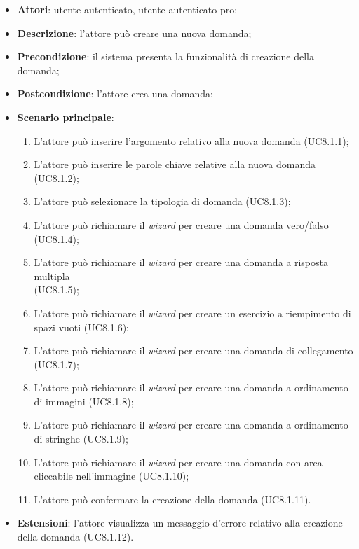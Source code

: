 	\begin{itemize}
		\item
			\textbf{Attori}: utente autenticato, utente autenticato pro;
		\item		
			\textbf{Descrizione}: l'attore può creare una nuova domanda;
		\item
			\textbf{Precondizione}: il sistema presenta la funzionalità di creazione della domanda;
		\item
			\textbf{Postcondizione}: l'attore crea una domanda;		
		\item
			\textbf{Scenario principale}:
	       		\begin{enumerate}
					\item
					L'attore può inserire l'argomento relativo alla nuova domanda (UC8.1.1);
					\item
					L'attore può inserire le parole chiave relative alla nuova domanda (UC8.1.2);
					\item
					L'attore può selezionare la tipologia di domanda (UC8.1.3);
					
					\item
					L'attore può richiamare il \textit{wizard} per creare una domanda vero/falso (UC8.1.4);
					\item
					L'attore può richiamare il \textit{wizard} per creare una domanda a risposta multipla \\(UC8.1.5);
					\item
					L'attore può richiamare il \textit{wizard} per creare un esercizio a riempimento di spazi vuoti (UC8.1.6);
					\item
					L'attore può richiamare il \textit{wizard} per creare una domanda di collegamento (UC8.1.7);
					\item
					L'attore può richiamare il \textit{wizard} per creare una domanda a ordinamento di immagini (UC8.1.8);
					\item
					L'attore può richiamare il \textit{wizard} per creare una domanda a ordinamento di stringhe (UC8.1.9);
					\item
					L'attore può richiamare il \textit{wizard} per creare una domanda con area cliccabile nell'immagine (UC8.1.10);
					\item
					L'attore può confermare la creazione della domanda (UC8.1.11).
	 			\end{enumerate}
	 	\item
			\textbf{Estensioni}: l'attore visualizza un messaggio d'errore relativo alla creazione della domanda (UC8.1.12).
	\end{itemize}
